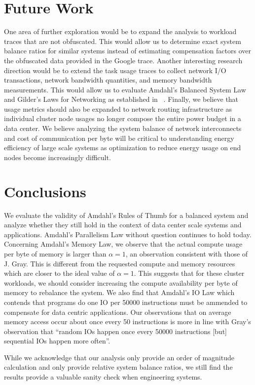 \documentclass{sig-alternate}
\begin{document}
\section{Future Work}

One area of further exploration would be to expand the analysis to workload traces that are not obfuscated.
This would allow us to determine exact system balance ratios for similar systems instead of estimating compensation factors over the obfuscated data provided in the Google trace.
Another interesting research direction would be to extend the task usage traces to collect network I/O transactions, network bandwidth quantities, and memory bandwidth measurements.
This would allow us to evaluate Amdahl's Balanced System Law and Gilder's Laws for Networking as established in ~\cite{export:68636}.
Finally, we believe that usage metrics should also be expanded to network routing infrastructure as individual cluster node usages no longer compose the entire power budget in a data center.
We believe analyzing the system balance of network interconnects and cost of communication per byte will be critical to understanding energy efficiency of large scale systems as optimization to reduce energy usage on end nodes become increasingly difficult.


\section{Conclusions}

We evaluate the validity of Amdahl's Rules of Thumb for a balanced system and analyze whether they still hold in the context of data center scale systems and applications.
Amdahl's Parallelism Law without question continues to hold today.
Concerning Amdahl's Memory Law, we observe that the actual compute usage per byte of memory is larger than $\alpha=1$, an observation consistent with those of J. Gray.
This is different from the requested compute and memory resources which are closer to the ideal value of $\alpha=1$.
This suggests that for these cluster workloads, we should consider increasing the compute availability per byte of memory to rebalance the system.
We also find that Amdahl's IO Law which contends that programs do one IO per 50000 instructions must be ammended to compensate for data centric applications.
Our observations that on average memory access occur about once every 50 instructions is more in line with Gray's observation that ``random IOs happen once every 50000 instructions [but] sequential IOs happen more often''.

While we acknowledge that our analysis only provide an order of magnitude calculation and only provide relative system balance ratios, we still find the results provide a valuable sanity check when engineering systems.





\end{document}
